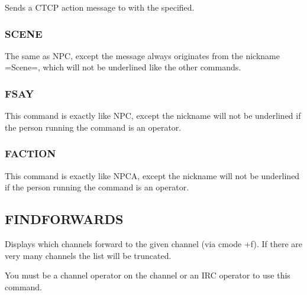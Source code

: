 	Sends a CTCP action message to  with the 
	 specified.

\subsubsection{SCENE}
     \literal{:} 

	The same as NPC, except the message always originates from the
	nickname =Scene=, which will not be underlined like the other commands.

\subsubsection{FSAY}
      \literal{:} 

	This command is exactly like NPC, except the nickname will not be
	underlined if the person running the command is an operator.


\subsubsection{FACTION}
      \literal{:} 

	This command is exactly like NPCA, except the nickname will not be
	underlined if the person running the command is an operator.



\subsection{FINDFORWARDS}


	Displays which channels forward to the given channel (via cmode +f). If
	there are very many channels the list will be truncated.

	You must be a channel operator on the channel or an IRC operator to use
	this command.


